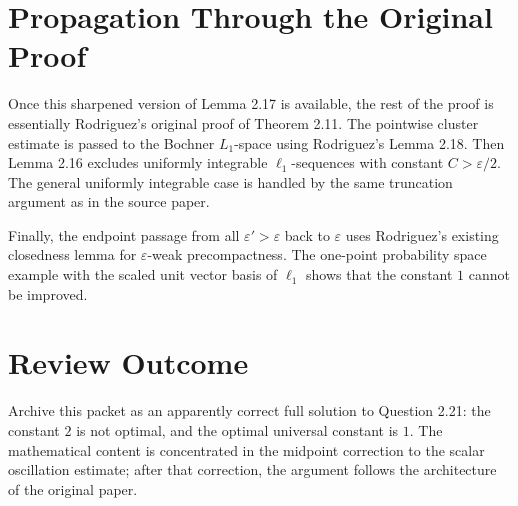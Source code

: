 \documentclass[11pt]{article}
\newcommand{\eps}{\varepsilon}
\begin{document}
\section*{Propagation Through the Original Proof}

Once this sharpened version of Lemma 2.17 is available, the rest of the proof
is essentially Rodriguez's original proof of Theorem 2.11. The pointwise
cluster estimate is passed to the Bochner \(L_1\)-space using Rodriguez's
Lemma 2.18. Then Lemma 2.16 excludes uniformly integrable \(\ell_1\)-sequences
with constant \(C>\eps/2\). The general uniformly integrable case is handled
by the same truncation argument as in the source paper.

Finally, the endpoint passage from all \(\eps'>\eps\) back to \(\eps\) uses
Rodriguez's existing closedness lemma for \(\eps\)-weak precompactness. The
one-point probability space example with the scaled unit vector basis of
\(\ell_1\) shows that the constant \(1\) cannot be improved.

\section*{Review Outcome}

Archive this packet as an apparently correct full solution to Question 2.21:
the constant \(2\) is not optimal, and the optimal universal constant is \(1\).
The mathematical content is concentrated in the midpoint correction to the
scalar oscillation estimate; after that correction, the argument follows the
architecture of the original paper.
\end{document}
